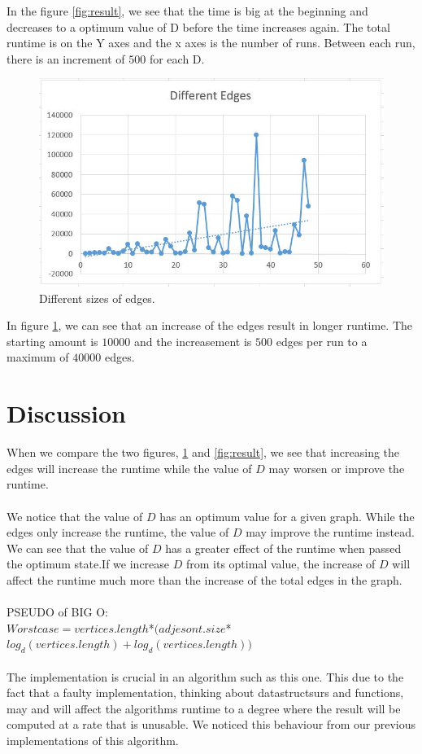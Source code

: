 \documentclass[paper=a4, fontsize=11pt]{scrartcl}
\numberwithin{equation}{section}		%
\numberwithin{figure}{section}			%
\numberwithin{table}{section}				%
\begin{document}
In the figure \ref{fig:result}, we see that the time is big at the beginning and decreases to a optimum value of D before the time increases again. The total runtime is on the Y axes and the x axes is the number of runs. Between each run, there is an increment of $500$ for each D. 

\begin{figure}[h!]
  \includegraphics[width=\linewidth]{edge.jpg}
  \caption{Different sizes of edges.}
  \label{fig:result2}
\end{figure}

In figure \ref{fig:result2}, we can see that an increase of the edges result in longer runtime. The starting amount is $10000$ and the increasement is $500$ edges per run to a maximum of $40000$ edges.


\section{Discussion}
When we compare the two figures, \ref{fig:result2} and \ref{fig:result}, we see that increasing the edges will increase the runtime while the value of $D$ may worsen or improve the runtime. 
\\~\\
We notice that the value of $D$ has an optimum value for a given graph. While the edges only increase the runtime, the value of $D$ may improve the runtime instead.
We can see that the value of $D$ has a greater effect of the runtime when passed the optimum state.If we increase $D$ from its optimal value, the increase of $D$ will affect the runtime much more than the increase of the total edges in the graph.
\\~\\
PSEUDO of BIG O:\\
$
Worst case = vertices.length $*$ (adjesont.size $*$ log_d(vertices.length) + log_d(vertices.length))
$\\~\\
The implementation is crucial in an algorithm such as this one. This due to the fact that a faulty implementation, thinking about datastructsurs and functions, may and will affect the algorithms runtime to a degree where the result will be computed at a rate that is unusable. We noticed this behaviour from our previous implementations of this algorithm.
\end{document}
